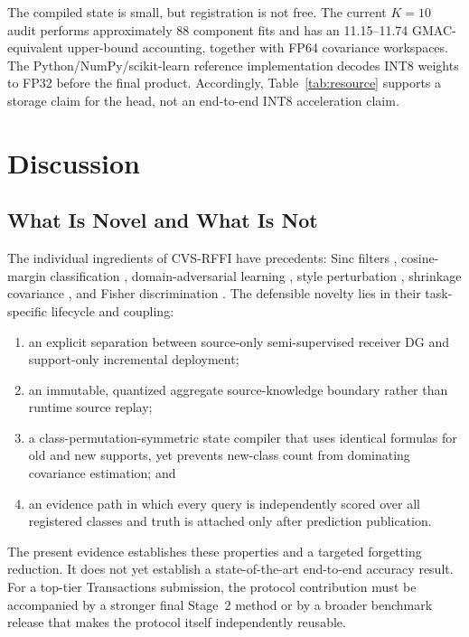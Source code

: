 \documentclass[journal]{IEEEtran}
\newcommand{\method}{CVS-RFFI}
\begin{document}
The compiled state is small, but registration is not free. The current \(K=10\) audit performs approximately 88 component fits and has an 11.15--11.74 GMAC-equivalent upper-bound accounting, together with FP64 covariance workspaces. The Python/NumPy/scikit-learn reference implementation decodes INT8 weights to FP32 before the final product. Accordingly, Table~\ref{tab:resource} supports a storage claim for the head, not an end-to-end INT8 acceleration claim.

\section{Discussion}

\subsection{What Is Novel and What Is Not}

The individual ingredients of \method{} have precedents: Sinc filters \cite{ravanelli2018sincnet}, cosine-margin classification \cite{wang2018cosface}, domain-adversarial learning \cite{ganin2016dann}, style perturbation \cite{zhou2021mixstyle}, shrinkage covariance \cite{ledoit2004covariance}, and Fisher discrimination \cite{fisher1936lda}. The defensible novelty lies in their task-specific lifecycle and coupling:

\begin{enumerate}
  \item an explicit separation between source-only semi-supervised receiver DG and support-only incremental deployment;
  \item an immutable, quantized aggregate source-knowledge boundary rather than runtime source replay;
  \item a class-permutation-symmetric state compiler that uses identical formulas for old and new supports, yet prevents new-class count from dominating covariance estimation; and
  \item an evidence path in which every query is independently scored over all registered classes and truth is attached only after prediction publication.
\end{enumerate}

The present evidence establishes these properties and a targeted forgetting reduction. It does not yet establish a state-of-the-art end-to-end accuracy result. For a top-tier Transactions submission, the protocol contribution must be accompanied by a stronger final Stage~2 method or by a broader benchmark release that makes the protocol itself independently reusable.
\end{document}
